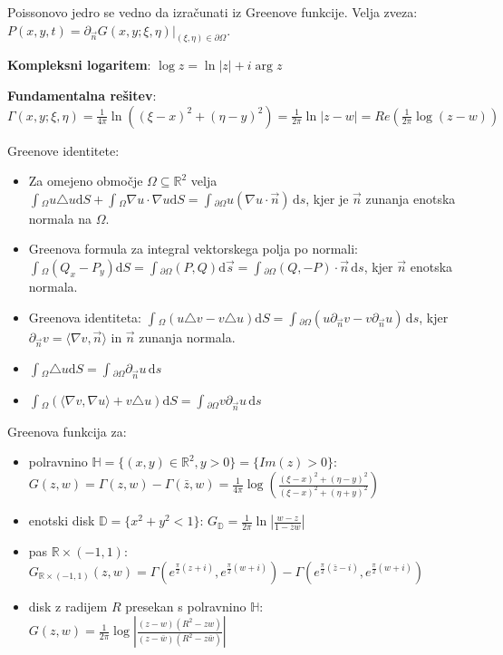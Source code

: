 \documentclass[11pt,a4paper]{amsart}
\theoremstyle{definition} %
\theoremstyle{plain} %
\newcommand{\ds}{\ensuremath{\,\mathrm{d}s}}
\let\oldint\int
\renewcommand{\int}{\oldint \!}
\newcommand{\R}{\mathbb R}
\begin{document}
Poissonovo jedro se vedno da izračunati iz Greenove funkcije. Velja zveza: $ P(x,y,t) = \partial_{\vec{n}} G (x,y;\xi , \eta ) |_{(\xi ,\eta ) \in \partial \Omega}$.

\textbf{Kompleksni logaritem}: $\log z = \ln |z| + i \arg z$

\textbf{Fundamentalna rešitev}: $\Gamma (x,y;\xi,\eta) = \frac{1}{4\pi} \ln ((\xi - x)^2 + (\eta - y)^2)=\frac{1}{2\pi} \ln |z-w| = Re ( \frac{1}{2\pi} \log (z-w) )$

Greenove identitete:

\begin{itemize}
\item Za omejeno območje $\Omega \subseteq \R^2$ velja $\int_\Omega u \triangle u \mathrm{d}S + \int_\Omega \nabla u \cdot \nabla u \mathrm{d}S = \int_{\partial \Omega} u(\nabla u \cdot \vec{n})\ds$, kjer je $\vec{n}$ zunanja enotska normala na $\Omega$.
\item Greenova formula za integral vektorskega polja po normali: $\int_\Omega (Q_x - P_y)  \mathrm{d} S = \int_{\partial \Omega} (P,Q)  \mathrm{d}\vec{s} = \int_{\partial \Omega} (Q,-P) \cdot \vec{n} \ds$, kjer $\vec{n}$ enotska normala.
\item Greenova identiteta: $\int_\Omega (u \triangle v - v \triangle u)  \mathrm{d}S = \int_{\partial \Omega} (u \partial_{\vec{n}}v - v \partial_{\vec{n}} u) \ds$, kjer $\partial_{\vec{n}} v = \langle \nabla v , \vec{n} \rangle$ in $\vec{n}$ zunanja normala.
\item  $\int_\Omega \triangle u  \mathrm{d}S = \int_{\partial \Omega}  \partial_{\vec{n}} u \ds$
\item  $\int_\Omega ( \langle \nabla v, \nabla u \rangle + v \triangle u)  \mathrm{d}S = \int_{\partial \Omega} v \partial_{\vec{n}} u \ds$
\end{itemize}

Greenova funkcija za:

\begin{itemize}

\item polravnino $\mathbb{H} = \{ (x,y) \in \R^2, y>0 \} = \{ Im(z) > 0 \}$:
  $G(z,w) = \Gamma (z,w) - \Gamma ( \bar{z},w) =  \frac{1}{4\pi} \log
  \left(\frac{(\xi -x)^2+(\eta -y)^2}{(\xi -x)^2+(\eta +y)^2}\right)$

\item enotski disk $\mathbb{D} = \{ x^2+y^2<1 \}$: $G_{\mathbb{D}} = \frac{1}{2\pi} \ln | \frac{w-z}{1-\bar{z}w} |$

\item pas $\R \times (-1,1)$: $G_{\R \times (-1,1)}(z,w) = \Gamma (e^{\frac{\pi}{2}(z+i)} , e^{\frac{\pi}{2}(w+i)}) - \Gamma (e^{\frac{\pi}{2}(\bar{z}-i)} , e^{\frac{\pi}{2}(w+i)})$

\item disk z radijem $R$ presekan s polravnino $\mathbb{H}$: $G(z, w) = \frac{1}{2 \pi}\log\left|\frac{(z-w)(R^2 - zw)}{(z-\bar{w})(R^2-z\bar{w})} \right|$

\end{itemize}
\end{document}

